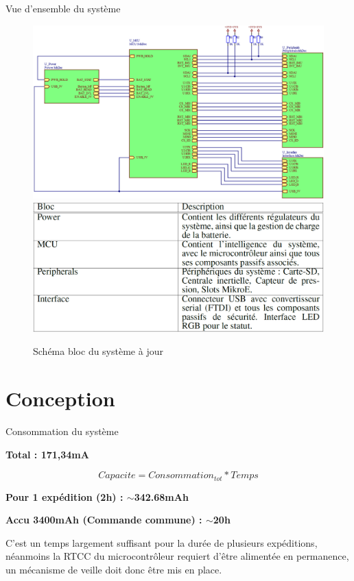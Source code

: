 \documentclass[compress,aspectratio=169]{beamer}
\begin{document}
\begin{frame}{Vue d'ensemble du système}
	\begin{figure}
		\par
		\noindent
		\includegraphics[width=0.55\linewidth]{Images/Dev-SCH/schemaBloc}%
		\hfill
		\includegraphics[width=0.45\linewidth]{Images/Dev-SCH/DescrBlocs}%
		\par
		\caption{Schéma bloc du système à jour}
	\end{figure}
\end{frame}

\section{Conception}

\begin{frame}[containsverbatim]{Consommation du système}
	\begin{center}
		   \fbox{\textit{\textcolor{red}{Carte-SD - 100mA}}}    
	\end{center}
	\textbf{Total : 171,34mA}

	\begin{equation}
		Capacite = Consommation_{tot} * Temps
	\end{equation}
	
	\textbf{Pour 1 expédition (2h) : $\sim$342.68mAh}
	
	\textbf{Accu 3400mAh (Commande commune) : $\sim$20h}
	
	C’est un temps largement suffisant pour la durée de plusieurs expéditions,
	néanmoins la RTCC du microcontrôleur requiert d’être alimentée
	en permanence, un mécanisme de veille doit donc être mis en place.
\end{frame}
\end{document}
